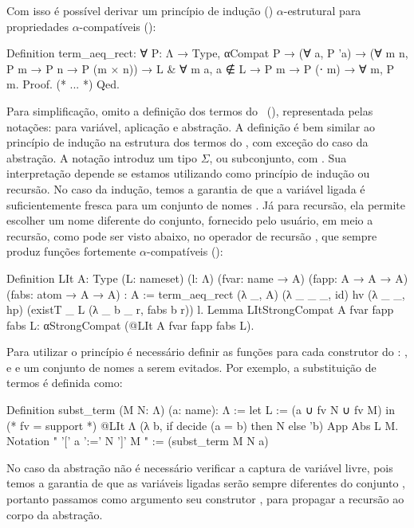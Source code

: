 Com isso é possível derivar um princípio de indução () $\alpha$-estrutural para propriedades $\alpha$-compatíveis ():
\begin{coqcode}
Definition term_aeq_rect:
  ∀ P: Λ → Type, αCompat P →
    (∀ a, P 'a) →
    (∀ m n, P m → P n → P (m × n)) →
    {L & ∀ m a, a ∉ L → P m → P (\a ⋅ m)} →
    ∀ m, P m.
Proof. (* ... *) Qed.
\end{coqcode}
Para simplificação, omito a definição dos termos do \lcalc~(), representada pelas notações:  para variável,  aplicação e  abstração. A definição  é bem similar ao princípio de indução na estrutura dos termos do \lcalc, com exceção do caso da abstração. A notação  introduz um tipo $\Sigma$, ou subconjunto, com . Sua interpretação depende se estamos utilizando como princípio de indução ou recursão. No caso da indução, temos a garantia de que a variável ligada é suficientemente fresca para um conjunto de nomes . Já para recursão, ela permite escolher um nome diferente do conjunto, fornecido pelo usuário, em meio a recursão, como pode ser visto abaixo, no operador de recursão , que sempre produz funções fortemente $\alpha$-compatíveis ():
\begin{coqcode}
Definition LIt {A: Type} (L: nameset) (l: Λ)
           (fvar: name → A) (fapp: A → A → A) (fabs: atom → A → A) : A :=
  term_aeq_rect (λ _, A) (λ _ _ _, id) hv (λ _ _, hp)
                (existT _ L (λ _ b _ r, fabs b r)) l.
Lemma LItStrongCompat {A} fvar fapp fabs L:
  αStrongCompat (@LIt A fvar fapp fabs L).
\end{coqcode}
Para utilizar o princípio é necessário definir as funções para cada construtor do \lcalc: ,  e  e um conjunto  de nomes a serem evitados. Por exemplo, a substituição de termos é definida como:
\begin{coqcode}
Definition subst_term (M N: Λ) (a: name): Λ :=
  let L := ({a} ∪ fv N ∪ fv M) in (* fv = support *)
  @LIt Λ (λ b, if decide (a = b) then N else 'b) App Abs L M.
Notation " '[' a ':=' N ']' M " := (subst_term M N a)
\end{coqcode}
No caso da abstração não é necessário verificar a captura de variável livre, pois temos a garantia de que as variáveis ligadas serão sempre diferentes do conjunto , portanto passamos como argumento seu construtor , para propagar a recursão ao corpo da abstração.

